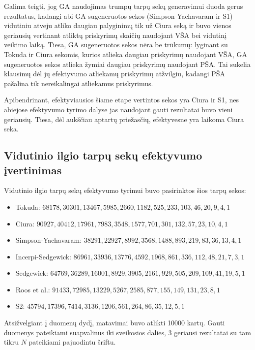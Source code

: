 \documentclass{VUMIFInfKursinis}
\begin{document}
Galima teigti, jog GA naudojimas trumpų tarpų sekų generavimui duoda gerus rezultatus, kadangi abi GA sugeneruotos sekos (Simpson-Yachavaram ir S1)
vidutiniu atveju atliko daugiau palyginimų tik už Ciura seką ir buvo vienos geriausių vertinant atliktų priskyrimų skaičių naudojant VŠA bei vidutinį veikimo laiką.
Tiesa, GA sugeneruotos sekos nėra be trūkumų: lyginant su Tokuda ir Ciura sekomis, kurios atlieka daugiau priskyrimų naudojant VŠA, GA sugeneruotos sekos atlieka žymiai daugiau priskyrimų
naudojant PŠA. Tai sukelia klausimų dėl jų efektyvumo atliekamų priskyrimų atžvilgiu, kadangi PŠA pašalina tik nereikalingai atliekamus priskyrimus.

Apibendrinant, efektyviausios šiame etape vertintos sekos yra Ciura ir S1,
nes abiejose efektyvumo tyrimo dalyse jas naudojant gauti rezultatai buvo vieni geriausių.
Tiesa, dėl aukščiau aptartų priežasčių, efektyvesne yra laikoma Ciura seka.

\subsection{Vidutinio ilgio tarpų sekų efektyvumo įvertinimas}

Vidutinio ilgio tarpų sekų efektyvumo tyrimui buvo pasirinktos šios tarpų sekos:
\begin{itemize}
  \item Tokuda: $68178,30301,13467,5985,2660,1182,525,233,103,46,20,9,4,1$ \cite{10.5555/645569.659879}
  \item Ciura: $90927,40412,17961,7983,3548,1577,701,301,132,57,23,10,4,1$ \cite{ciura2001best}
  \item Simpson-Yachavaram: $38291,22927,8992,3568,1488,893,219,83,36,13,4,1$ \cite{simpson1999faster}
  \item Incerpi-Sedgewick: $86961,33936,13776,4592,1968,861,336,112,48,21,7,3,1$ \cite{incerpi1985improved}
  \item Sedgewick: $64769,36289,16001,8929,3905,2161,929,505,209,109,41,19,5,1$ \cite{SEDGEWICK1986159}
  \item Roos et al.: $91433,72985,13229,5267,2585,877,155,149,131,23,8,1$ \cite{roos2002genetic}
  \item S2: $45794,17396,7414,3136,1206,561,264,86,35,12,5,1$
\end{itemize}

Atsižvelgiant į duomenų dydį, matavimai buvo atlikti 10000 kartų.
Gauti duomenys pateikiami suapvalinus iki sveikosios dalies,
3 geriausi rezultatai su tam tikru $N$ pateikiami pajuodintu šriftu.
\end{document}
